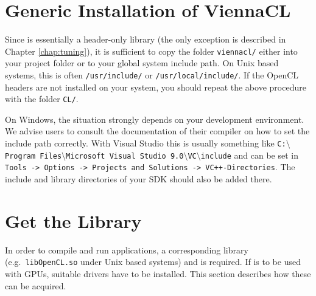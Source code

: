 
\section{Generic Installation of ViennaCL} \label{sec:viennacl-installation}
Since {\ViennaCL} is essentially a header-only library (the only exception is
described in Chapter \ref{chap:tuning}), it is sufficient to copy the folder
\lstinline|viennacl/| either into your project folder or to your global system
include path. On Unix based systems, this is often \lstinline|/usr/include/| or
\lstinline|/usr/local/include/|. If the OpenCL headers are not installed on your system,
you should repeat the above procedure with the folder \lstinline|CL/|.

On Windows, the situation strongly depends on your development environment. We advise users
to consult the documentation of their compiler on how to set the include
path correctly. With Visual Studio this is usually something like \texttt{C:$\setminus$Program Files$\setminus$Microsoft Visual Studio 9.0$\setminus$VC$\setminus$include}
and can be set in \texttt{Tools -> Options -> Projects and Solutions -> VC++-\-Directories}. The include and library directories of your {\OpenCL} SDK should also be added there.



\section{Get the {\OpenCL} Library}
\label{opencllibs}
In order to compile and run {\OpenCL} applications, a corresponding library
(e.g.~\texttt{libOpenCL.so} under Unix based systems) and is required.
If {\OpenCL} is to be used with GPUs, suitable drivers have to be installed. This section describes how these can be acquired.


